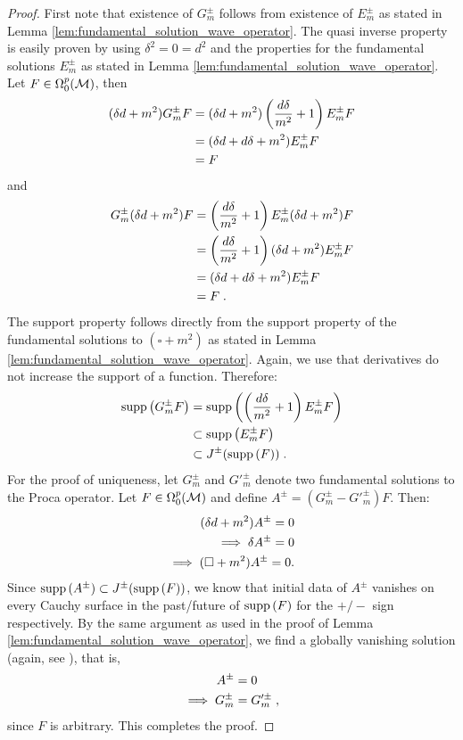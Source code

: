 \begin{proof}
	First note that existence of $G_m^\pm$ follows from existence of $E_m^\pm$ as stated in Lemma \ref{lem:fundamental_solution_wave_operator}. The quasi inverse property is easily proven by using $\delta ^2 = 0 = d^2$ and the properties for the fundamental solutions $E_m^\pm$ as stated in Lemma \ref{lem:fundamental_solution_wave_operator}. Let $F \in \Omega^p_0(\mathcal{M})$, then
\begin{align}
(\delta d +m^2) G^\pm_m F
&= (\delta d +m^2)\left( \frac{d \delta}{m^2} + 1\right) E_m^\pm F \notag\\
&= (\delta d +d \delta +m^2) E_m^\pm F \notag\\
&= F
\end{align}
and
\begin{align}
G^\pm_m (\delta d +m^2)  F
&=\left( \frac{d \delta}{m^2} + 1\right) E_m^\pm (\delta d +m^2) F \notag \\
&=\left( \frac{d \delta}{m^2} + 1\right) (\delta d +m^2)E_m^\pm F\notag \\
&= (\delta d +d \delta +m^2) E_m^\pm F \notag\\
&= F \;.
\end{align}
The support property follows directly from the support property of the fundamental solutions to $(\square + m^2)$ as stated in Lemma \ref{lem:fundamental_solution_wave_operator}. Again, we use that derivatives do not increase the support of a function. Therefore:
\begin{align}
\text{\upshape{supp}}\left(G^\pm_m  F \right)
&= \text{\upshape{supp}}\left(\left( \frac{d \delta}{m^2} + 1\right) E_m^\pm  F \right) \notag\\
&\subset \text{\upshape{supp}}\left(E_m^\pm F \right) \notag\\
&\subset J^\pm(\text{\upshape{supp}}\left(F \right)) \;.
\end{align}
For the proof of uniqueness, let $G^\pm_m$ and $G'^\pm_m$ denote two fundamental solutions to the Proca operator. Let $F \in \Omega^p_0(\mathcal{M})$ and define $A^\pm = (G^\pm_m - G'^\pm_m)F $.
Then:
\begin{align}
(\delta d + m^2) A^\pm = 0 \notag\\
\implies \delta A^\pm = 0 \notag\\
\implies (\square + m^2)A^\pm = 0.
\end{align}
Since $\text{\upshape{supp}}\left(A^\pm\right) \subset J^\pm(\text{\upshape{supp}}\left(F \right))$, we know that initial data of $A^\pm$ vanishes on every Cauchy surface in the past/future of $\text{\upshape{supp}}\left(F \right)$ for the $+/-$ sign respectively. By the same argument as used in the proof of Lemma \ref{lem:fundamental_solution_wave_operator}, we find a globally vanishing solution (again, see \cite[Corollary 3.2.4]{baer_ginoux_pfaeffle}), that is,
\begin{align}
A^\pm &= 0 \notag\\
\implies G^\pm_m &= G'^\pm_m \;,
\end{align}
since $F $ is arbitrary. This completes the proof.
\end{proof}
